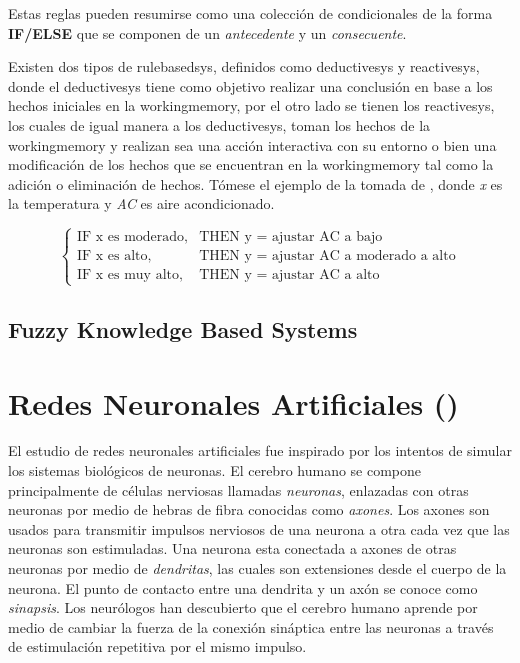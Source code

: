 Estas reglas pueden resumirse como una colección de condicionales de la forma \textbf{IF/ELSE} que se componen de un \emph{antecedente} y un \emph{consecuente}.

Existen dos tipos de \gls{rulebasedsys}, definidos como \gls{deductivesys} y \gls{reactivesys}, donde el \gls{deductivesys} tiene como objetivo realizar una conclusión en base a los hechos iniciales en la \gls{workingmemory}, por el otro lado se tienen los \gls{reactivesys}, los cuales de igual manera a los \gls{deductivesys}, toman los hechos de la \gls{workingmemory} y realizan sea una acción interactiva con su entorno o bien una modificación de los hechos que se encuentran en la \gls{workingmemory} tal como la adición o eliminación de hechos. Tómese el ejemplo de la  tomada de \cite{Mendel}, donde \emph{x} es la temperatura y \emph{AC} es aire acondicionado.

\begin{equation} \label{eq:rbs-example}
  \left\{ \begin{array}{ll}
            \text{IF x es moderado,} & \text{THEN y = ajustar AC a bajo} \\
            \text{IF x es alto,}     & \text{THEN y = ajustar AC a moderado a alto} \\
            \text{IF x es muy alto,} & \text{THEN y = ajustar AC a alto} 
          \end{array} \right.
\end{equation}

\subsection{Fuzzy Knowledge Based Systems}



\section{Redes Neuronales Artificiales ()} \label{sec:ANN}
El estudio de redes neuronales artificiales fue inspirado por los intentos de simular los sistemas biológicos de neuronas. El cerebro humano se compone principalmente de células nerviosas llamadas \emph{neuronas}, enlazadas con otras neuronas por medio de hebras de fibra conocidas como \emph{axones}. Los axones son usados para transmitir impulsos nerviosos de una neurona a otra cada vez que las neuronas son estimuladas. Una neurona esta conectada a axones de otras neuronas por medio de \emph{dendritas}, las cuales son extensiones desde el cuerpo de la neurona. El punto de contacto entre una dendrita y un axón se conoce como \emph{sinapsis}. Los neurólogos han descubierto que el cerebro humano aprende por medio de cambiar la fuerza de la conexión sináptica entre las neuronas a través de estimulación repetitiva por el mismo impulso.

